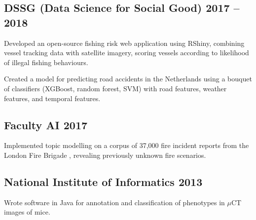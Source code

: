 \subsection{DSSG (Data Science for Social Good) \hfill 2017 -- 2018}
    \begin{list2}
        \item Developed an open-source fishing risk web application using RShiny, combining vessel tracking data with satellite imagery, scoring vessels according to likelihood of illegal fishing behaviours.
        \item Created a model for predicting road accidents in the Netherlands using a bouquet of classifiers (XGBoost, random forest, SVM) with road features, weather features, and temporal features.
    \end{list2}

\subsection{Faculty AI \hfill 2017}
    \begin{list2}
        \item Implemented topic modelling on a corpus of 37,000 fire incident reports from the London Fire Brigade , revealing previously unknown fire scenarios.
    \end{list2}


\subsection{National Institute of Informatics \hfill 2013}
    \begin{list2}
      \item Wrote software in Java for annotation and classification of phenotypes in $\mu$CT images of mice.
    \end{list2}
